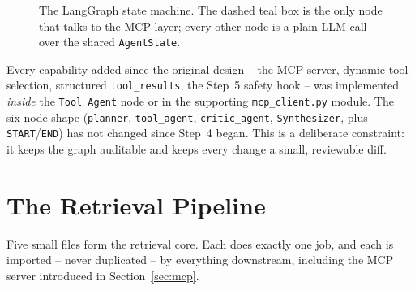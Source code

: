 \documentclass[11pt,a4paper]{article}
\begin{document}
\begin{figure}[h!]
\caption{The LangGraph state machine. The dashed teal box is the only node that talks to the MCP layer; every other node is a plain LLM call over the shared \texttt{AgentState}.}
\label{fig:bigpicture}
\end{figure}

\begin{warnbox}
Every capability added since the original design -- the MCP server, dynamic
tool selection, structured \texttt{tool\_results}, the Step~5 safety hook --
was implemented \emph{inside} the \texttt{Tool Agent} node or in the
supporting \texttt{mcp\_client.py} module. The six-node shape
(\texttt{planner}, \texttt{tool\_agent}, \texttt{critic\_agent},
\texttt{Synthesizer}, plus \texttt{START}/\texttt{END}) has not changed
since Step~4 began. This is a deliberate constraint: it keeps the graph
auditable and keeps every change a small, reviewable diff.
\end{warnbox}



\clearpage
\section{The Retrieval Pipeline}
\label{sec:retrieval}

Five small files form the retrieval core. Each does exactly one job, and
each is imported -- never duplicated -- by everything downstream, including
the MCP server introduced in Section~\ref{sec:mcp}.
\end{document}
